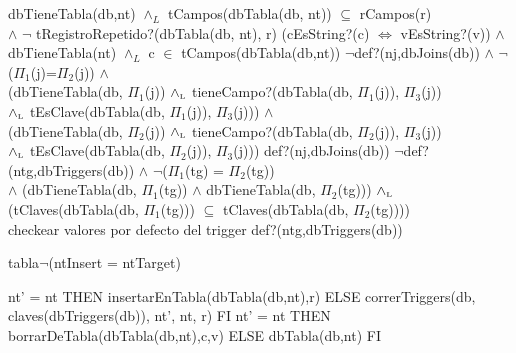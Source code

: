 \begin{tad}{}
\tadGeneradores
{}
    {dbTieneTabla(db,nt) $\land_L$ tCampos(dbTabla(db, nt)) $\subseteq$ rCampos(r) \\
    $\land$ $\neg$ tRegistroRepetido?(dbTabla(db, nt), r) }
    {(cEsString?(c) $\iff$ vEsString?(v)) $\land$ dbTieneTabla(nt)
        $\land_L$ c $\in$ tCampos(dbTabla(db,nt))}
{$\neg$def?(nj,dbJoins(db)) $\land$ $\neg$($\Pi_1$(j)=$\Pi_2$(j)) $\land$ \hspace*{10em}\\ 
    (dbTieneTabla(db, $\Pi_1$(j)) $\land_{\mathrm{\scriptscriptstyle{L}}}$ tieneCampo?(dbTabla(db, $\Pi_1$(j)), $\Pi_3$(j)) \\
    $\land_{\mathrm{\scriptscriptstyle{L}}}$ tEsClave(dbTabla(db, $\Pi_1$(j)), $\Pi_3$(j))) $\land$ \\
    (dbTieneTabla(db, $\Pi_2$(j)) $\land_{\mathrm{\scriptscriptstyle{L}}}$ tieneCampo?(dbTabla(db, $\Pi_2$(j)), $\Pi_3$(j)) \\
    $\land_{\mathrm{\scriptscriptstyle{L}}}$ tEsClave(dbTabla(db, $\Pi_2$(j)), $\Pi_3$(j)))}
    {def?(nj,dbJoins(db))}
    {$\neg$def?(ntg,dbTriggers(db))
    $\land$ $\neg$($\Pi_1$(tg) = $\Pi_2$(tg)) \\
    $\land$ (dbTieneTabla(db, $\Pi_1$(tg)) $\land$ dbTieneTabla(db, $\Pi_2$(tg)))
    $\land_{\mathrm{\scriptscriptstyle{L}}}$ (tClaves(dbTabla(db, $\Pi_1$(tg))) $\subseteq$ tClaves(dbTabla(db, $\Pi_2$(tg)))) \\
    \cuidado checkear valores por defecto del trigger}
    {def?(ntg,dbTriggers(db))}

\tadOtrasOperaciones


    {tabla}{$\neg$(ntInsert = ntTarget)}


    {\IF nt' = nt
        THEN insertarEnTabla(dbTabla(db,nt),r)
        ELSE correrTriggers(db, claves(dbTriggers(db)), nt', nt, r)
     FI
    }
    {\IF nt' = nt
        THEN borrarDeTabla(dbTabla(db,nt),c,v)
        ELSE dbTabla(db,nt) FI}


\end{tad}
